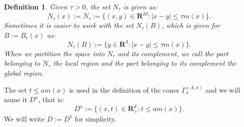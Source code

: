 \documentclass[a4paper,oneside,10pt]{amsproc}
\theoremstyle{plain}
\newtheorem{definition}{Definition}
\theoremstyle{remark}
\theoremstyle{definition}
\renewcommand{\leq}{\leqslant}
\renewcommand{\leq}{\leqslant}
\newcommand{\R}{\mathbf R}
\renewcommand{\leq}{\leqslant}%
\begin{document}
\begin{definition}
  Given $\tau > 0$, the set $N_\tau$ is given as:
  \begin{equation}
    \label{eq:Definition-local-region}
    N_\tau(x) := N_\tau := \{(x, y) \in \R^{2d} : |x - y| \leq \tau
    m(x) \}.
  \end{equation}
  Sometimes it is easier to work with the set $N_\tau(B)$, which is
  given for $B := B_r(x)$ as:
  \begin{equation}
    \label{eq:Definition-local-region-ball}
    N_\tau(B) := \{y \in \R^d : |x - y| \leq \tau m(x) \}.
  \end{equation}
  When we partition the space into $N_\tau$ and its complement, we
  call the part belonging to $N_\tau$ the \emph{local region} and the
  part belonging to its complement the \emph{global region}.
\end{definition}
The set $t \leq a m(x)$ is used in the definition of the cones
$\Gamma_x^{(A, a)}$ and we will name it $D^a$, that is:
\begin{equation}
  \label{eq:Definition-cut-off-set-D}
  D^a := \{(x, t) \in \R^d_+ : t \leq a m(x)\}.
\end{equation}
We will write $D := D^1$ for simplicity.
\end{document}
